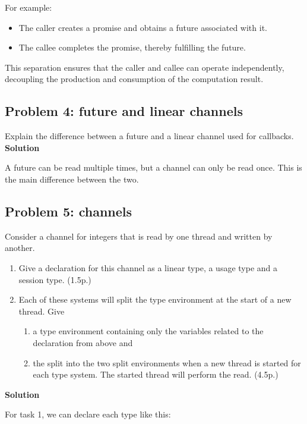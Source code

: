 For example:
\begin{itemize}
    \item The caller creates a promise and obtains a future associated with it.
    \item The callee completes the promise, thereby fulfilling the future.
\end{itemize}
This separation ensures that the caller and callee can operate independently, decoupling the production and consumption of the computation result.

\subsection{Problem 4: future and linear channels}

Explain the difference between a future and a linear channel used for callbacks. \\

\textbf{Solution}

A future can be read multiple times, but a channel can only be read once. 
This is the main difference between the two.


\subsection{Problem 5: channels}

Consider a channel for integers that is read by one thread and written by
another.

\begin{enumerate}
    \item Give a declaration for this channel as a linear type, a usage type and a session type. (1.5p.)
    \item Each of these systems will split the type environment at the start of a new thread. Give
    \begin{enumerate}
        \item a type environment containing only the variables related to the declaration from
        above and
        \item the split into the two split environments when a new thread is started
        for each type system. The started thread will perform the read. (4.5p.)
    \end{enumerate}
\end{enumerate}


\textbf{Solution}  

For task 1, we can declare each type like this: \\

